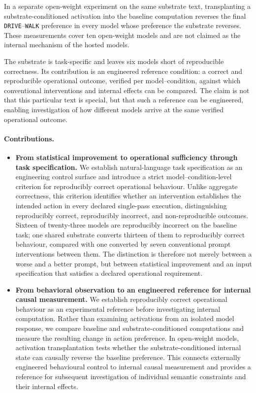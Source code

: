 In a separate open-weight experiment on the same substrate text,
transplanting a substrate-conditioned activation into the baseline
computation reverses the final \texttt{DRIVE}--\texttt{WALK} preference
in every model whose preference the substrate reverses. These
measurements cover ten open-weight models and are not claimed as the
internal mechanism of the hosted models.

The substrate is task-specific and leaves six models short of
reproducible correctness. Its contribution is an engineered
reference condition: a correct and reproducible operational outcome,
verified per model--condition, against which conventional interventions
and internal effects can be compared. The claim is not that this
particular text is special, but that such a reference can be
engineered, enabling investigation of how different models arrive
at the same verified operational outcome.

\paragraph{Contributions.}

\begin{itemize}\itemsep2pt

\item \textbf{From statistical improvement to operational
sufficiency through task specification.}
We establish natural-language task specification as an engineering
control surface and introduce a strict model--condition-level
criterion for reproducibly correct operational behaviour.
Unlike aggregate correctness, this criterion identifies whether
an intervention establishes the intended action in every declared
single-pass execution, distinguishing reproducibly correct,
reproducibly incorrect, and non-reproducible outcomes.
Sixteen of twenty-three models are reproducibly incorrect on the
baseline task; one shared substrate converts thirteen of them
to reproducibly correct behaviour, compared with one converted
by seven conventional prompt interventions between them. The distinction is
therefore not merely between a worse and a better prompt, but
between statistical improvement and an input specification that
satisfies a declared operational requirement.

\item \textbf{From behavioral observation to an engineered reference
for internal causal measurement.}
We establish reproducibly correct operational behaviour as an
experimental reference before investigating internal computation.
Rather than examining activations from an isolated model response,
we compare baseline and substrate-conditioned computations
and measure the resulting change in action preference.
In open-weight models, activation transplantation tests whether
the substrate-conditioned internal state can causally reverse
the baseline preference. This connects externally engineered
behavioural control to internal causal measurement and provides
a reference for subsequent investigation of individual semantic
constraints and their internal effects.

\end{itemize}

